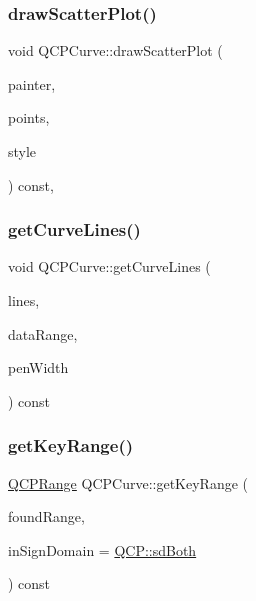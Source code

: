\subsubsection{\texorpdfstring{draw\+Scatter\+Plot()}{drawScatterPlot()}}
{\footnotesize\ttfamily void Q\+C\+P\+Curve\+::draw\+Scatter\+Plot (\begin{DoxyParamCaption}\item[{\hyperlink{class_q_c_p_painter}{Q\+C\+P\+Painter} $\ast$}]{painter,  }\item[{const Q\+Vector$<$ Q\+PointF $>$ \&}]{points,  }\item[{const \hyperlink{class_q_c_p_scatter_style}{Q\+C\+P\+Scatter\+Style} \&}]{style }\end{DoxyParamCaption}) const\hspace{0.3cm}{\ttfamily [protected]}, {\ttfamily [virtual]}}

\mbox{\label{class_q_c_p_curve_aefca1e5127fae2d7ff65b9e921637c58}} 
\subsubsection{\texorpdfstring{get\+Curve\+Lines()}{getCurveLines()}}
{\footnotesize\ttfamily void Q\+C\+P\+Curve\+::get\+Curve\+Lines (\begin{DoxyParamCaption}\item[{Q\+Vector$<$ Q\+PointF $>$ $\ast$}]{lines,  }\item[{const \hyperlink{class_q_c_p_data_range}{Q\+C\+P\+Data\+Range} \&}]{data\+Range,  }\item[{double}]{pen\+Width }\end{DoxyParamCaption}) const\hspace{0.3cm}{\ttfamily [protected]}}

\mbox{\label{class_q_c_p_curve_a22d09087f78f254731197cc0b8783299}} 
\subsubsection{\texorpdfstring{get\+Key\+Range()}{getKeyRange()}}
{\footnotesize\ttfamily \hyperlink{class_q_c_p_range}{Q\+C\+P\+Range} Q\+C\+P\+Curve\+::get\+Key\+Range (\begin{DoxyParamCaption}\item[{bool \&}]{found\+Range,  }\item[{\hyperlink{namespace_q_c_p_afd50e7cf431af385614987d8553ff8a9}{Q\+C\+P\+::\+Sign\+Domain}}]{in\+Sign\+Domain = {\ttfamily \hyperlink{namespace_q_c_p_afd50e7cf431af385614987d8553ff8a9aa38352ef02d51ddfa4399d9551566e24}{Q\+C\+P\+::sd\+Both}} }\end{DoxyParamCaption}) const\hspace{0.3cm}{\ttfamily [virtual]}}


